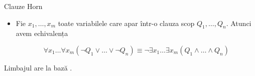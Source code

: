 \documentclass[xcolor=pdftex,romanian,colorlinks]{beamer}
\begin{document}









\begin{frame}{Clauze Horn}


\begin{center}
\end{center}


\begin{itemize}



\bigskip
\item Fie $x_1, \ldots, x_m$ toate variabilele care apar într-o clauza scop 
$Q_1,\ldots, Q_n$. Atunci avem echivalența

\vspace{-.6cm}
$$
\forall x_1\ldots \forall x_m (\neg Q_1\vee\ldots \vee \neg Q_n) 
\equiv \neg \exists x_1\ldots \exists x_m (Q_1\wedge \ldots \wedge  Q_n)
$$

\end{itemize}

\begin{center}


Limbajul  are la bază .

\end{center}
\end{frame}
\end{document}
